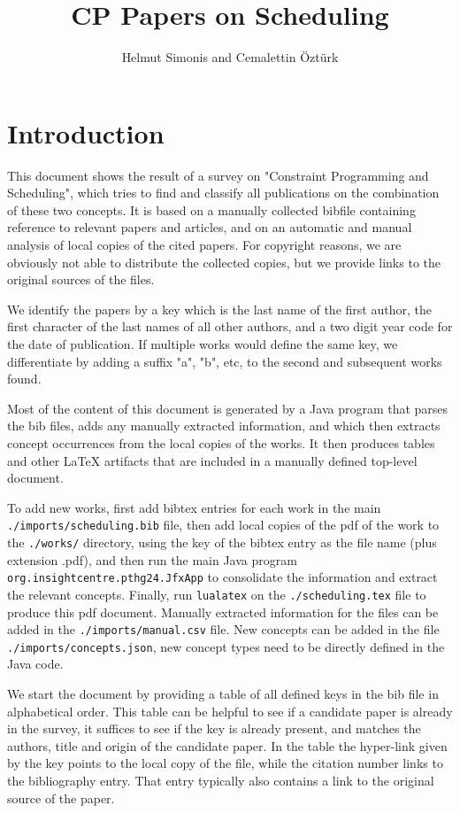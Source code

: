 \documentclass[a4paper]{article}
\title{CP Papers on Scheduling}
\author{Helmut Simonis and Cemalettin Öztürk}
\begin{document}

\maketitle
\section{Introduction}

This document shows the result of a survey on "Constraint Programming and Scheduling", which tries to find and classify all publications on the combination of these two concepts. It is based on a manually collected bibfile containing reference to relevant papers and articles, and on an automatic and manual analysis of local copies of the cited papers. For copyright reasons, we are obviously not able to distribute the collected copies, but we provide links to the original sources of the files. 

We identify the papers by a key which is the last name of the first author, the first character of the last names of all other authors, and a two digit year code for the date of publication. If multiple works would define the same key, we differentiate by adding a suffix "a", "b", etc, to the second and subsequent works found.

Most of the content of this document is generated by a Java program that parses the bib files, adds any manually extracted information, and which then extracts concept occurrences from the local copies of the works. It then produces tables and other LaTeX  artifacts that are included in a manually defined top-level document.

To add new works, first add bibtex entries for each work in the main \texttt{./imports/scheduling.bib} file, then add local copies of the pdf of the work to the \texttt{./works/} directory, using the key of the bibtex entry as the file name (plus extension .pdf), and then run the main Java program \texttt{org.insightcentre.pthg24.JfxApp} to consolidate the information and extract the relevant concepts. Finally, run \texttt{lualatex} on the \texttt{./scheduling.tex} file to produce this pdf document. Manually extracted information for the files can be added in the \texttt{./imports/manual.csv} file. New concepts can be added in the file \texttt{./imports/concepts.json}, new concept types need to be directly defined in the Java code.

We start the document by providing a table of all defined keys in the bib file in alphabetical order. This table can be helpful to see if a candidate paper is already in the survey, it suffices to see if the key is already present, and matches the authors, title and origin of the candidate paper. In the table the hyper-link given by the key points to the local copy of the file, while the citation number links to the bibliography entry. That entry typically also contains a link to the original source of the paper.
\end{document}
